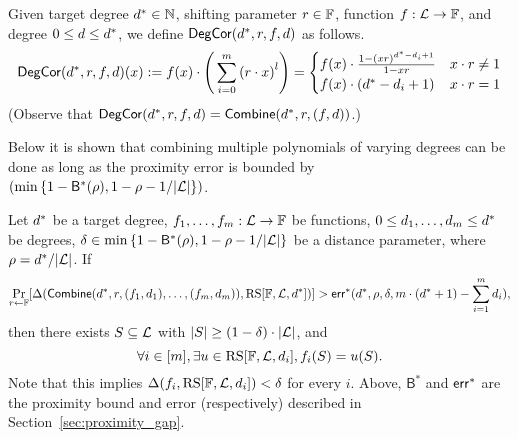 \begin{definition}\label{def:deg_corr}
\leanok
{}
    Given target degree $d^*\in\mathbb{N}$, shifting parameter $r\in\mathbb{F}$, function $f:\mathcal{L}\rightarrow\mathbb{F}$, and degree $0\leq d\leq d^*$, we define $\mathsf{DegCor}(d^*,r,f,d)$ as follows.
    \[
        \mathsf{DegCor}(d^*,r,f,d)(x):=f(x)\cdot\Bigg(\sum_{i=0}^{m}{(r\cdot x)}^l\Bigg)=
        \begin{cases}
            f(x)\cdot\frac{1-{(xr)}^{d^*-d_i+1}}{1-xr} & x\cdot r\neq 1\\
            f(x)\cdot (d^*-d_i+1) & x\cdot r= 1
        \end{cases}
    \]
(Observe that $\mathsf{DegCor}(d^*,r,f,d)=\mathsf{Combine}(d^*,r,(f,d))$.)
\end{definition}

Below it is shown that combining multiple polynomials of varying degrees can be done as long as the proximity error is bounded by $(\min{\{1-{\mathsf{B}}^*(\rho),1-\rho-1/|\mathcal{L}|\}})$.

\begin{lemma}\label{lemma:combine}
\leanok
{}
    Let $d^*$ be a target degree, $f_1,\ldots,f_m:\mathcal{L}\rightarrow\mathbb{F}$ be functions, $0\leq d_1,\ldots,d_m\leq d^*$ be degrees, $\delta\in\min{\{1-{\mathsf{B}}^*(\rho),1-\rho-1/|\mathcal{L}|\}}$ be a distance parameter, where $\rho=d^*/|\mathcal{L}|$. If
    \[
        \Pr_{r\gets\mathbb{F}}[\Delta(\mathsf{Combine}(d^*,r,(f_1,d_1),\ldots,(f_m,d_m)),\mathrm{RS}[\mathbb{F},\mathcal{L},d^*])]>\mathsf{err}^*(d^*,\rho,\delta,m\cdot(d^*+1)-\sum_{i=1}^{m}d_i),
    \] 
    then there exists $S\subseteq \mathcal{L}$ with $|S|\geq(1-\delta)\cdot|\mathcal{L}|$, and
    \[
        \forall i\in[m],\exists u\in\mathrm{RS}[\mathbb{F},\mathcal{L},d_i], f_i(S)=u(S).
    \]
    Note that this implies $\Delta(f_i,\mathrm{RS}[\mathbb{F},\mathcal{L},d_i])<\delta$ for every $i$. Above, ${\mathsf{B}}^*$ and ${\mathsf{err}}^*$ are the proximity bound and error (respectively) described in Section~\ref{sec:proximity_gap}.
\end{lemma}